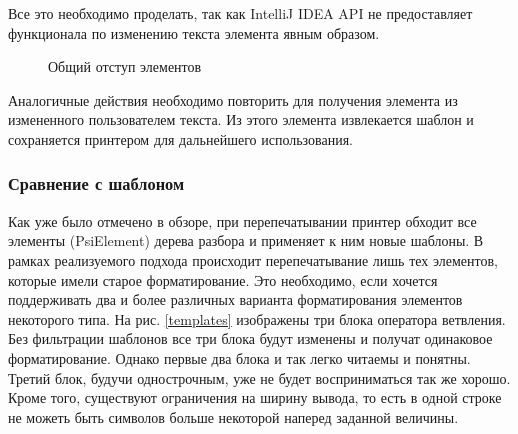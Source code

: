 Все это необходимо проделать, так как IntelliJ IDEA API не предоставляет функционала по изменению текста элемента явным образом. 

\begin{figure}[h]
	\centering
	
	\caption{Общий отступ элементов}
	\label{fig:offsetExample}
\end{figure}

Аналогичные действия необходимо повторить для получения элемента из измененного
пользователем текста. 
Из этого элемента извлекается шаблон и сохраняется принтером для дальнейшего использования.



\subsubsection{Сравнение с шаблоном}
Как уже было отмечено в обзоре, при перепечатывании принтер обходит все элементы (PsiElement) дерева разбора и применяет к ним новые шаблоны. 
В рамках реализуемого подхода происходит перепечатывание лишь тех элементов, которые имели старое форматирование.
Это необходимо, если хочется поддерживать два и более различных варианта форматирования элементов некоторого типа. 
На рис. \ref{templates} изображены три блока оператора ветвления. 
Без фильтрации шаблонов все три блока будут изменены и получат одинаковое форматирование. %
Однако первые два блока и так легко читаемы и понятны. 
Третий блок, будучи однострочным, уже не будет восприниматься так же хорошо.
Кроме того, существуют ограничения на ширину вывода, то есть в одной строке не можеть быть символов больше некоторой наперед заданной величины.

